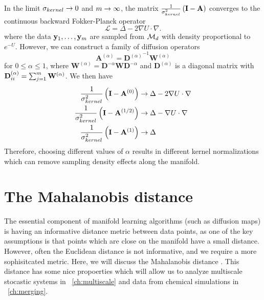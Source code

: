 In the limit $\sigma_{kernel} \rightarrow 0$ and $m \rightarrow \infty$, the matrix $\frac{1}{\sigma_{kernel}^2} \left( \mathbf{I} - \mathbf{A} \right) $ converges to the continuous backward Fokker-Planck operator \cite{nadler2006diffusion}
\begin{equation}
	\mathcal{L} = \Delta - 2 \nabla U \cdot \nabla.
	\label{eq:limiting_operator}
\end{equation}
where the data $\mathbf{y}_1, \dots , \mathbf{y}_m$ are sampled from $\mathcal{M}_d$ with density proportional to $e^{-U}$. 
%
However, we can construct a family of diffusion operators 
\begin{equation} \label{eq:kernel2}
\mathbf{A}^{(\alpha)} = {\mathbf{D}^{(\alpha)}}^{-1} \mathbf{W}^{(\alpha)}
\end{equation}
for $0 \le \alpha \le 1$, where $\mathbf{W}^{(\alpha)} = \mathbf{D}^{-\alpha} \mathbf{W} \mathbf{D}^{-\alpha}$ 
and $\mathbf{D}^{(\alpha)}$ is a diagonal matrix with $\mathbf{D}^{(\alpha)}_{ii} = \sum_{j=1}^m \mathbf{W}^{(\alpha)}$.
%
We then have \cite{coifman2005geometric}
\begin{equation}
\begin{aligned}
\frac{1}{\sigma_{kernel}^2} \left( \mathbf{I} - \mathbf{A}^{(0)} \right) & \rightarrow \Delta - 2 \nabla U \cdot \nabla \\
\frac{1}{\sigma_{kernel}^2} \left( \mathbf{I} - \mathbf{A}^{(1/2)} \right) & \rightarrow \Delta - \nabla U \cdot \nabla \\
\frac{1}{\sigma_{kernel}^2} \left( \mathbf{I} - \mathbf{A}^{(1)} \right) & \rightarrow \Delta  
\end{aligned}
\end{equation}
%
Therefore, choosing different values of $\alpha$ results in different kernel normalizations which can remove sampling density effects along the manifold. 


\section{The Mahalanobis distance}
\label{subsec:mahalanobis}

The essential component of manifold learning algorithms (such as diffusion maps) is having an informative distance metric between data points, as one of the key assumptions is that points which are close on the manifold have a small distance. 
%
However, often the Euclidean distance is not informative, and we require a more sophisitcated metric. 
%
Here, we will discuss the Mahalanobis distance \cite{mahalanobis1936generalized}. 
%
This distance has some nice propoerties which will allow us to analyze multiscale stocastic systems in \chap~\ref{ch:multiscale} and data from chemical simulations in \chap~\ref{ch:merging}. 

